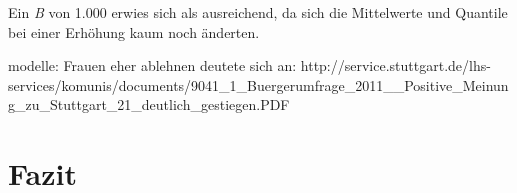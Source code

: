 \documentclass{Vorlage}
\begin{document}
Ein \textit{B} von 1.000 erwies sich als ausreichend, da sich die Mittelwerte und Quantile bei einer Erhöhung kaum noch änderten.

modelle: Frauen eher ablehnen deutete sich an: http://service.stuttgart.de/lhs-services/komunis/documents/9041_1_Buergerumfrage_2011__Positive_Meinung_zu_Stuttgart_21_deutlich_gestiegen.PDF


\section{Fazit}

\clearpage



 





\clearpage

\end{document}
